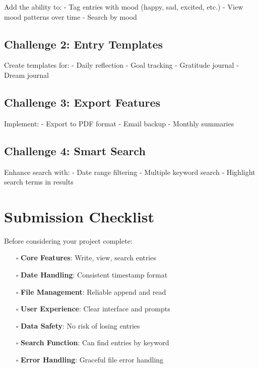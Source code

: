 \documentclass[
  letterpaper,
  DIV=11,
  numbers=noendperiod,
  oneside]{scrreprt}
\providecommand{\tightlist}{%
  \setlength{\itemsep}{0pt}\setlength{\parskip}{0pt}}\usepackage{longtable,booktabs,array}
\begin{document}
Add the ability to: - Tag entries with mood (happy, sad, excited, etc.)
- View mood patterns over time - Search by mood

\subsection{Challenge 2: Entry
Templates}\label{challenge-2-entry-templates}

Create templates for: - Daily reflection - Goal tracking - Gratitude
journal - Dream journal

\subsection{Challenge 3: Export
Features}\label{challenge-3-export-features}

Implement: - Export to PDF format - Email backup - Monthly summaries

\subsection{Challenge 4: Smart Search}\label{challenge-4-smart-search}

Enhance search with: - Date range filtering - Multiple keyword search -
Highlight search terms in results

\section{Submission Checklist}\label{submission-checklist-6}

Before considering your project complete:

\begin{itemize}
\tightlist
\item[$\square$]
  \textbf{Core Features}: Write, view, search entries
\item[$\square$]
  \textbf{Date Handling}: Consistent timestamp format
\item[$\square$]
  \textbf{File Management}: Reliable append and read
\item[$\square$]
  \textbf{User Experience}: Clear interface and prompts
\item[$\square$]
  \textbf{Data Safety}: No risk of losing entries
\item[$\square$]
  \textbf{Search Function}: Can find entries by keyword
\item[$\square$]
  \textbf{Error Handling}: Graceful file error handling
\end{itemize}
\end{document}
